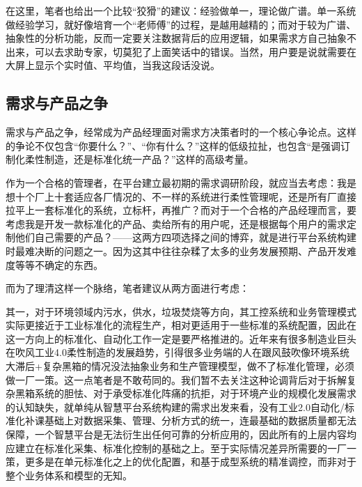 \documentclass[]{book}
\begin{document}
在这里，笔者也给出一个比较``狡猾''的建议：经验做单一，理论做广谱。单一系统做经验学习，就好像培育一个``老师傅''的过程，是越用越精的；而对于较为广谱、抽象性的分析功能，反而一定要关注数据背后的应用逻辑，如果需求方自己抽象不出来，可以去求助专家，切莫犯了上面笑话中的错误。当然，用户要是说就需要在大屏上显示个实时值、平均值，当我这段话没说。

\hypertarget{ux9700ux6c42ux4e0eux4ea7ux54c1ux4e4bux4e89}{%
\subsection{需求与产品之争}\label{ux9700ux6c42ux4e0eux4ea7ux54c1ux4e4bux4e89}}

需求与产品之争，经常成为产品经理面对需求方决策者时的一个核心争论点。这样的争论不仅包含``你要什么？''、``你有什么？''这样的低级拉扯，也包含``是强调订制化柔性制造，还是标准化统一产品？''这样的高级考量。

作为一个合格的管理者，在平台建立最初期的需求调研阶段，就应当去考虑：我是想十个厂上十套适应各厂情况的、不一样的系统进行柔性管理呢，还是所有厂直接拉平上一套标准化的系统，立标杆，再推广？而对于一个合格的产品经理而言，要考虑我是开发一款标准化的产品、卖给所有的用户呢，还是根据每个用户的需求定制他们自己需要的产品？------这两方四项选择之间的博弈，就是进行平台系统构建时最难决断的问题之一。因为这其中往往杂糅了太多的业务发展预期、产品开发难度等等不确定的东西。

而为了理清这样一个脉络，笔者建议从两方面进行考虑：

其一，对于环境领域内污水，供水，垃圾焚烧等方向，其工控系统和业务管理模式实际更接近于工业标准化的流程生产，相对更适用于一些标准的系统配置，因此在这一方向上的标准化、自动化工作一定是要严格推进的。近年来有很多制造业巨头在吹风工业4.0柔性制造的发展趋势，引得很多业务端的人在跟风鼓吹像环境系统大滞后+复杂黑箱的情况没法抽象业务和生产管理模型，做不了标准化管理，必须做一厂一策。这一点笔者是不敢苟同的。我们暂不去关注这种论调背后对于拆解复杂黑箱系统的胆怯、对于承受标准化阵痛的抗拒，对于环境产业的规模化发展需求的认知缺失，就单纯从智慧平台系统构建的需求出发来看，没有工业2.0自动化/标准化补课基础上对数据采集、管理、分析方式的统一，连最基础的数据质量都无法保障，一个智慧平台是无法衍生出任何可靠的分析应用的，因此所有的上层内容均应建立在标准化采集、标准化控制的基础之上。至于实际情况差异所需要的一厂一策，更多是在单元标准化之上的优化配置，和基于成型系统的精准调控，而非对于整个业务体系和模型的无知。
\end{document}
